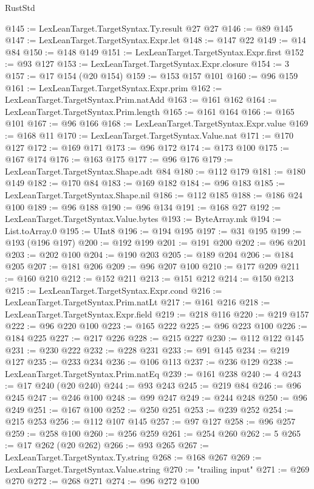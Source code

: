 \begin{lexlean}{RustStd}
\begin{coremodule}
@145 := LexLeanTarget.TargetSyntax.Ty.result @27 @27
@146 := @89 @145
@147 := LexLeanTarget.TargetSyntax.Expr.let
@148 := @147 @22
@149 := @14 @84
@150 := @148 @149
@151 := LexLeanTarget.TargetSyntax.Expr.first
@152 := @93 @127
@153 := LexLeanTarget.TargetSyntax.Expr.closure
@154 := 3
@157 := @17 @154 (@20 @154)
@159 := @153 @157 @101
@160 := @96 @159
@161 := LexLeanTarget.TargetSyntax.Expr.prim
@162 := LexLeanTarget.TargetSyntax.Prim.natAdd
@163 := @161 @162
@164 := LexLeanTarget.TargetSyntax.Prim.length
@165 := @161 @164
@166 := @165 @101
@167 := @96 @166
@168 := LexLeanTarget.TargetSyntax.Expr.value
@169 := @168 @11
@170 := LexLeanTarget.TargetSyntax.Value.nat
@171 := @170 @127
@172 := @169 @171
@173 := @96 @172
@174 := @173 @100
@175 := @167 @174
@176 := @163 @175
@177 := @96 @176
@179 := LexLeanTarget.TargetSyntax.Shape.adt @84
@180 := @112 @179
@181 := @180 @149
@182 := @170 @84
@183 := @169 @182
@184 := @96 @183
@185 := LexLeanTarget.TargetSyntax.Shape.nil
@186 := @112 @185
@188 := @186 @24 @100
@189 := @96 @188
@190 := @96 @134
@191 := @168 @27
@192 := LexLeanTarget.TargetSyntax.Value.bytes
@193 := ByteArray.mk
@194 := List.toArray.{0}
@195 := UInt8
@196 := @194 @195
@197 := @31 @195
@199 := @193 (@196 @197)
@200 := @192 @199
@201 := @191 @200
@202 := @96 @201
@203 := @202 @100
@204 := @190 @203
@205 := @189 @204
@206 := @184 @205
@207 := @181 @206
@209 := @96 @207 @100
@210 := @177 @209
@211 := @160 @210
@212 := @152 @211
@213 := @151 @212
@214 := @150 @213
@215 := LexLeanTarget.TargetSyntax.Expr.cond
@216 := LexLeanTarget.TargetSyntax.Prim.natLt
@217 := @161 @216
@218 := LexLeanTarget.TargetSyntax.Expr.field
@219 := @218 @116
@220 := @219 @157
@222 := @96 @220 @100
@223 := @165 @222
@225 := @96 @223 @100
@226 := @184 @225
@227 := @217 @226
@228 := @215 @227
@230 := @112 @122 @145
@231 := @230 @222
@232 := @228 @231
@233 := @91 @145
@234 := @219 @127
@235 := @233 @234
@236 := @106 @113
@237 := @236 @129
@238 := LexLeanTarget.TargetSyntax.Prim.natEq
@239 := @161 @238
@240 := 4
@243 := @17 @240 (@20 @240)
@244 := @93 @243
@245 := @219 @84
@246 := @96 @245
@247 := @246 @100
@248 := @99 @247
@249 := @244 @248
@250 := @96 @249
@251 := @167 @100
@252 := @250 @251
@253 := @239 @252
@254 := @215 @253
@256 := @112 @107 @145
@257 := @97 @127
@258 := @96 @257
@259 := @258 @100
@260 := @256 @259
@261 := @254 @260
@262 := 5
@265 := @17 @262 (@20 @262)
@266 := @93 @265
@267 := LexLeanTarget.TargetSyntax.Ty.string
@268 := @168 @267
@269 := LexLeanTarget.TargetSyntax.Value.string
@270 := "trailing input"
@271 := @269 @270
@272 := @268 @271
@274 := @96 @272 @100

\end{coremodule}
\end{lexlean}
